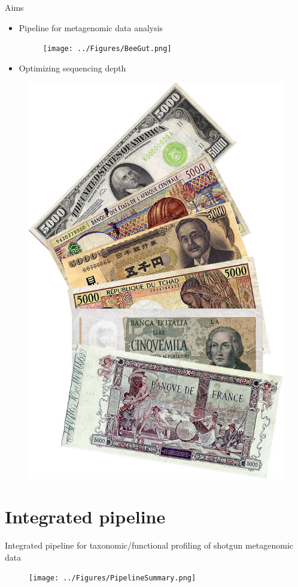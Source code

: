 \documentclass{beamer}
\begin{document}
\begin{frame}{Aims}
    \begin{itemize}
        \item Pipeline for metagenomic data analysis
        \begin{figure}
            \texttt{[image: ../Figures/BeeGut.png]}
        \end{figure}
        \item Optimizing sequencing depth
    \end{itemize}
    \begin{figure}
        \includegraphics[height=0.4\textwidth]{../Figures/Billets_de_5000.jpg}
    \end{figure}
\end{frame}


\section{Integrated pipeline}
\begin{frame}{Integrated pipeline for taxonomic/functional profiling of shotgun metagenomic data}
    \begin{figure}
        \texttt{[image: ../Figures/PipelineSummary.png]}
    \end{figure}
\end{frame}
\end{document}
